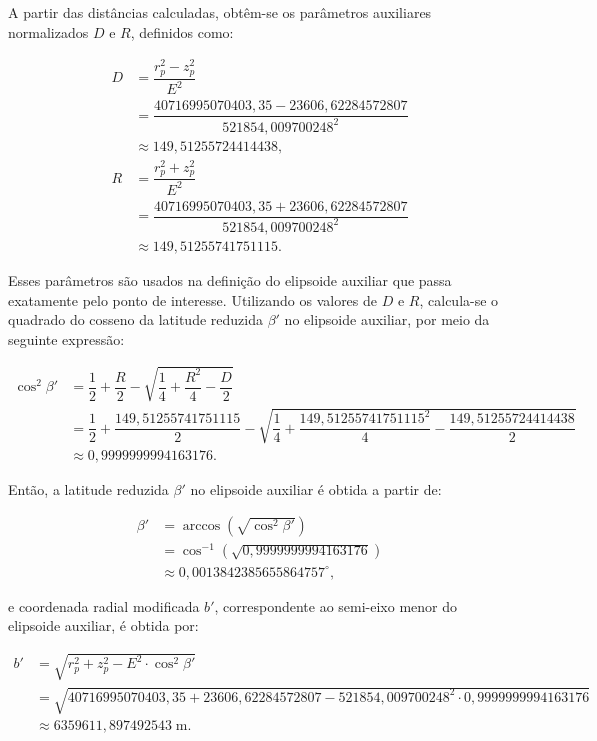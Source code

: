 \noindent
A partir das distâncias calculadas, obtêm-se os parâmetros auxiliares normalizados \(D\) e \(R\), definidos como:

\[
\begin{aligned}
   D &= \dfrac{r_p^2 - z_p^2}{E^2} \\
     &= \dfrac{40716995070403{,}35 - 23606{,}62284572807}{521854{,}009700248^2} \\
     &\approx 149{,}51255724414438 \text{,} \\
   R &= \dfrac{r_p^2 + z_p^2}{E^2} \\
     &= \dfrac{40716995070403{,}35 + 23606{,}62284572807}{521854{,}009700248^2} \\
     &\approx 149{,}51255741751115 \text{.}
\end{aligned}
\]

\noindent
Esses parâmetros são usados na definição do elipsoide auxiliar que passa exatamente pelo ponto de interesse. Utilizando os valores de \(D\) e \(R\), calcula-se o quadrado do cosseno da latitude reduzida \(\beta'\) no elipsoide auxiliar, por meio da seguinte expressão:

\[
\begin{aligned}
\cos^2 \beta' &= \dfrac{1}{2} + \dfrac{R}{2} - \sqrt{ \dfrac{1}{4} + \dfrac{R^2}{4} - \dfrac{D}{2} } \\
              &= \dfrac{1}{2} + \dfrac{149{,}51255741751115}{2} - \sqrt{ \dfrac{1}{4} + \dfrac{149{,}51255741751115^2}{4} - \dfrac{149{,}51255724414438}{2} } \\
              &\approx 0{,}9999999994163176 \text{.}
\end{aligned}
\]

\noindent
Então, a latitude reduzida \(\beta'\) no elipsoide auxiliar é obtida a partir de:

\[
\begin{aligned}
   \beta' &= \arccos\left( \sqrt{\cos^2 \beta'} \right) \\
          &= \cos^{-1}\left( \sqrt{0{,}9999999994163176} \right) \\
          &\approx 0{,}0013842385655864757^\circ \text{,}
\end{aligned}
\]

\noindent
e coordenada radial modificada \(b'\), correspondente ao semi-eixo menor do elipsoide auxiliar, é obtida por:

\[
\begin{aligned}
   b' &= \sqrt{r_p^2 + z_p^2 - E^2 \cdot \cos^2 \beta'} \\
      &= \sqrt{40716995070403{,}35 + 23606{,}62284572807 - 521854{,}009700248^2 \cdot 0{,}9999999994163176} \\
     &\approx 6359611{,}897492543 \; \text{m} \text{.}
\end{aligned}
\]


